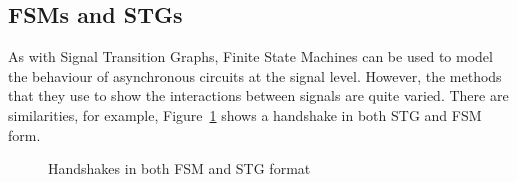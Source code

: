 \subsection{FSMs and STGs \label{sub:FSMs-STGs}}

As with Signal Transition Graphs, Finite State Machines can be used to model the behaviour of asynchronous circuits at the signal level. However,
the methods that they use to show the interactions between signals are quite varied. There are similarities, for example, Figure~\ref{fig:handshakes-all}
shows a handshake in both STG and FSM form.

\begin{figure}[H]
\centering
{}
\hspace{20mm}
  \caption{\label{fig:handshakes-all} Handshakes in both FSM and STG format}
\end{figure}

